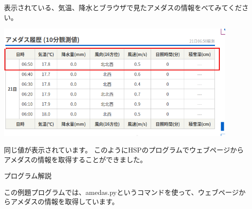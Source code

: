 \bigskip


表示されている、気温、降水とブラウザで見たアメダスの情報をべてみてください。



\begin{center}
\includegraphics[width=0.9\textwidth]{./text08-img/textbook-img029-1.png}

\end{center}
同じ値が表示されています。
このようにHSPのプログラムでウェブページからアメダスの情報を取得することができました。



\clearpage
プログラム解説

この例題プログラムでは、amedas.pyというコマンドを使って、ウェブページからアメダスの情報を取得しています。



